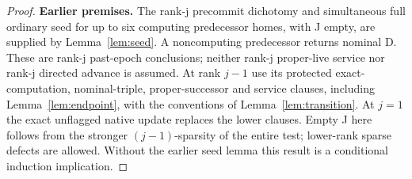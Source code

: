 \begin{proof}


\textbf{Earlier premises.} The rank-j precommit dichotomy and simultaneous full ordinary seed for up to six computing predecessor homes, with J empty, are supplied by Lemma~\ref{lem:seed}. A noncomputing predecessor returns nominal D. These are rank-j past-epoch conclusions; neither rank-j proper-live service nor rank-j directed advance is assumed. At rank \(j- 1\) use its protected exact-computation, nominal-triple, proper-successor and service clauses, including Lemma~\ref{lem:endpoint}, with the conventions of Lemma~\ref{lem:transition}. At \(j=1\) the exact unflagged native update replaces the lower clauses. Empty J here follows from the stronger \((j- 1)\)-sparsity of the entire test; lower-rank sparse defects are allowed. Without the earlier seed lemma this result is a conditional induction implication.


\end{proof}
